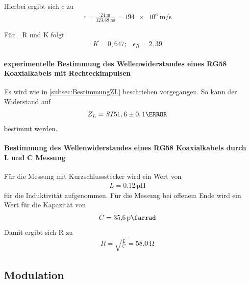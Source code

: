\documentclass[a4paper,twoside,final]{article}
\begin{document}
Hierbei ergibt sich c zu
\begin{align}
c = \frac{\SI{24}{\meter}}{\SI{123,68}{\nano\second}}= \SI{194e6}{\meter\per\second}
\end{align}

Für \epsilon_R und K folgt
\begin{align}
K = 0,647 ;\;\;\ \epsilon_R = 2,39
\end{align}

\paragraph{experimentelle Bestimmung des Wellenwiderstandes eines RG58 Koaxialkabels mit Rechteckimpulsen}
Es wird wie in \ref{subsec:BestimmungZL} beschrieben vorgegangen. So kann der Widerstand auf
\begin{align}
Z_L = SI{51,6 \pm 0,1}{\ohm}
\end{align}
bestimmt werden.

\paragraph{Bestimmung des Wellenwiderstandes eines RG58 Koaxialkabels durch L und C Messung}
Für die Messung mit Kurzschlussstecker wird ein Wert von
\begin{align}
L = \SI{0,12}{\micro\henry}
\end{align}
für die Induktivität aufgenommen. Für die Messung bei offenem Ende wird ein Wert für die Kapazität von
\begin{align}
C = \SI{35,6}{\pico\farrad}
\end{align}
Damit ergibt sich R zu
\begin{align}
R = \sqrt{\frac{L}{C}} =  \SI{58,0}{\ohm}
\end{align}

\subsection{Modulation}
\end{document}

